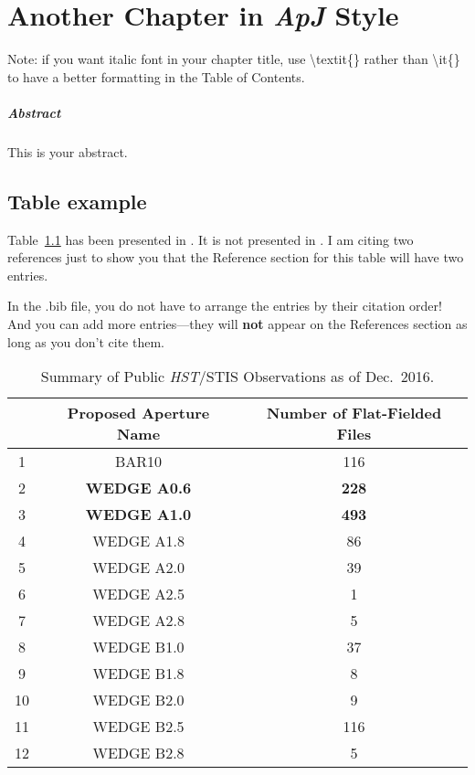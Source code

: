 \chapter{Another Chapter in \textit{ApJ} Style}\label{chapter-apj-dup}
Note: if you want italic font in your chapter title, use \textbackslash{textit}\{\} rather than \textbackslash{it}\{\} to have a better formatting in the Table of Contents.
\paragraph*{Abstract} This is your abstract.

\section{Table example}
Table~\ref{tab:stis-obs} has been presented in \citet{ren17}. It is not presented in \citet{ren18}. I am citing two references just to show you that the Reference section for this table will have two entries.

In the .bib file, you do not have to arrange the entries by their citation order! And you can add more entries---they will \textbf{not} appear on the References section as long as you don't cite them.


\begin{table}[htb!]
\centering
\caption[Summary of {\it HST}/STIS coronagraphic imaging observations as of 2016 December.]{Summary of Public {\it HST}/STIS Observations as of Dec.~2016.}
\label{tab:stis-obs}
\begin{tabular}{ccc}\hline\hline
   & Proposed Aperture Name & Number of Flat-Fielded Files \\ \hline
1  & BAR10                  & 116             \\
2  & {\bf WEDGE A0.6}             & {\bf 228}            \\
3  & {\bf WEDGE A1.0}             & {\bf 493}             \\
4  & WEDGE A1.8             & 86              \\
5  & WEDGE A2.0             & 39              \\
6  & WEDGE A2.5             & 1               \\
7  & WEDGE A2.8             & 5               \\
8  & WEDGE B1.0             & 37              \\
9  & WEDGE B1.8             & 8               \\
10 & WEDGE B2.0             & 9               \\
11 & WEDGE B2.5             & 116             \\
12 & WEDGE B2.8             & 5\\ \hline
\end{tabular}
\end{table}
